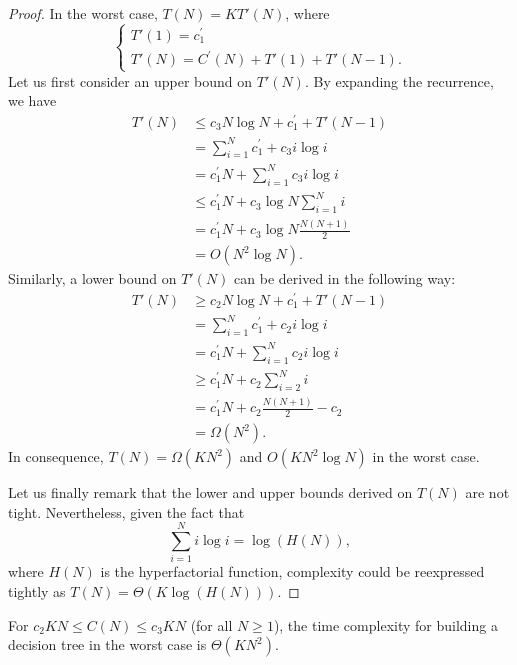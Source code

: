 \begin{proof}
In the worst case, $T(N) = K T'(N)$, where
\begin{equation}
\begin{cases}
T'(1) = c_1^\prime \\
T'(N) = C^\prime(N) +  T'(1) + T'(N-1).
\end{cases}
\end{equation}
Let us first consider an upper bound on $T'(N)$. By expanding the recurrence, we have
\begin{align}
T'(N) &\leq c_3 N \log N + c_1^\prime + T'(N-1) \nonumber \\
      &= \sum_{i=1}^N c_1^\prime + c_3 i\log i \nonumber \\
      &= c_1^\prime N + \sum_{i=1}^N c_3 i\log i \nonumber \\
      &\leq c_1^\prime N + c_3 \log N \sum_{i=1}^N i \nonumber \\
      &= c_1^\prime N + c_3 \log N \frac{N(N+1)}{2} \nonumber \\
      &= O(N^2 \log N).
\end{align}
Similarly, a lower
bound on $T'(N)$ can be derived in the following way:
\begin{align}
T'(N) &\geq c_2 N \log N + c_1^\prime + T'(N-1) \nonumber \\
      &= \sum_{i=1}^N c_1^\prime + c_2 i\log i \nonumber \\
      &= c_1^\prime N + \sum_{i=1}^N c_2 i\log i \nonumber \\
      &\geq c_1^\prime N + c_2 \sum_{i=2}^N i \nonumber \\
      &= c_1^\prime N + c_2 \frac{N(N+1)}{2} - c_2 \nonumber \\
      &= \Omega(N^2).
\end{align}
In consequence, $T(N) = \Omega(K N^2)$ and $O(K N^2 \log N)$ in the worst case.

Let us finally remark that the lower and upper bounds derived on $T(N)$ are not
tight. Nevertheless, given the fact that
\begin{equation}
\sum_{i=1}^N i \log i = \log(H(N)),
\end{equation}
where $H(N)$ is the hyperfactorial function, complexity
could be reexpressed tightly as $T(N) = \Theta(K \log(H(N)))$.
\end{proof}

\begin{theorem}\label{thm:6:worst:kn}
For $c_2 K N \leq C(N)\leq c_3 K N$ (for all $N \geq 1$), the time complexity for building a decision
tree in the worst case is $\Theta(K N^2)$.
\end{theorem}

